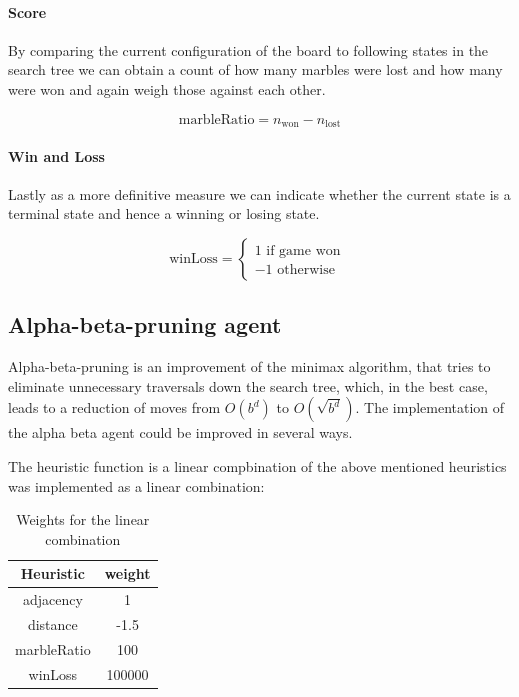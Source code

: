 \documentclass{llncs}
\begin{document}
\paragraph{Score}
By comparing the current configuration of the board to following states in the search tree we can obtain a count of how many marbles were lost and how many were won and again weigh those against each other.

$$ \text{marbleRatio} = n_{\text{won}} - n_{\text{lost}} $$

\paragraph{Win and Loss}
Lastly as a more definitive measure we can indicate whether the current state is a terminal state and hence a winning or losing state.

$$ \text{winLoss} =
  \begin{cases}
    1 \text{ if game won } \\
    -1 \text{ otherwise}
  \end{cases}
$$

\subsection{Alpha-beta-pruning agent}
Alpha-beta-pruning is an improvement of the minimax algorithm, that tries to eliminate unnecessary traversals down the search tree, which, in the best case, leads to a reduction of moves from $ O(b^d) $ to $ O(\sqrt{b^d}) $. The implementation of the alpha beta agent could be improved in several ways.

The heuristic function is a linear compbination of the above mentioned heuristics was implemented as a linear combination:

\begin{table}
  \begin{center}
    \begin{tabular}{ | c | c | }
      \hline
      Heuristic   & weight \\
      \hline
      adjacency   & 1      \\
      \hline
      distance    & -1.5   \\
      \hline
      marbleRatio & 100    \\
      \hline
      winLoss     & 100000 \\
      \hline
    \end{tabular}
  \end{center}
  \caption{Weights for the linear combination}
  \label{heuristic_table}
\end{table}
\end{document}
